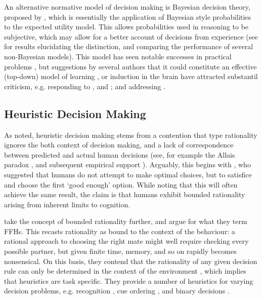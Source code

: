 An alternative normative model of decision making is Bayesian decision theory, proposed by \citet{Robbins1964}, which is essentially the application of Bayesian style probabilities to the expected utility model. This allows probabilities used in reasoning to be subjective, which may allow for a better account of decisions from experience (see \citet{Hau2008,Hertwig2004} for results elucidating the distinction, and comparing the performance of several non-Bayesian models). This model has seen notable successes in practical problems \citep{McNamara1980,Survey2003,Kristensen1997}, but suggestions by several authors  that it could constitute an effective (top-down) model of learning \citep{Tenenbaum2006,Griffiths2010}, or induction \citep{Gallistel2012} in the brain have attracted substantil criticism, e.g. \citet{Bowers2012} responding to \citeauthor{Tenenbaum2006}, and \citeauthor{Griffiths2010}; and \citet{Miller2012} addressing \citeauthor{Gallistel2012}.

\subsection{Heuristic Decision Making}\label{sub:heuristic_theories}

As noted, heuristic decision making stems from a contention that \citeauthor{Neumann1953} type rationality ignores the both context of decision making, and a lack of correspondence between predicted and actual human decisions (see, for example the Allais paradox \citep{Society2013}, and subsequent empirical support \citep{Oliver2003,Burke1996}). Arguably, this begins with \citet{Simon1956}, who suggested that humans do not attempt to make optimal choices, but to satisfice and choose the first `good enough' option. While noting that this will often achieve the same result, the claim is that humans exhibit bounded rationality \citep{Simon2000} arising from inherent limits to cognition.

\citet{Gigerenzer1996} take the concept of bounded rationality further, and argue for what they term \acp{FFH}. This recasts rationality as bound to the context of the behaviour: a rational approach to choosing the right mate might well require checking every possible partner, but given finite time, memory, and so on rapidly becomes nonsensical. On this basis, they contend that the rationality of any given decision rule can only be determined in the context of the environment \citep{Todd2003}, which implies that heuristics are task specific. They provide a number of heuristics for varying decision problems, e.g. recognition \citep{Goldstein2002}, cue ordering \citep{Gigerenzer1999,Todd2004}, and binary decisions \citep{Brandstatter2006}.

